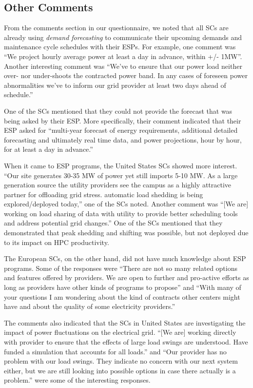 \subsection{Other Comments}
\label{comm}
From the comments section in our questionnaire, we noted that all SCs are already using \emph{demand forecasting} to communicate their upcoming demands and maintenance cycle schedules with their ESPs. For example, one comment was ``We project hourly average power at least a day in advance, within +/- 1MW''. Another interesting comment was ``We've to ensure that our power load neither over- nor under-shoots the contracted power band. In any cases of foreseen power abnormalities we've to inform our grid provider at least two days ahead of schedule.''

One of the SCs mentioned that they could not provide the forecast that was being asked by their ESP. More specifically, their comment indicated that their ESP asked for ``multi-year forecast of energy requirements, additional detailed forecasting and ultimately real time data, and power projections, hour by hour, for at least a day in advance.''

When it came to ESP programs, the United States SCs showed more interest. ``Our site generates 30-35 MW of power yet still imports 5-10 MW. As a large generation source the utility providers see the campus as a highly attractive partner for offloading grid stress. automatic load shedding is being explored/deployed today,'' one of the SCs noted. Another comment was ``[We are] working on load sharing of data with utility to provide better scheduling tools and address potential grid changes.'' One of the SCs mentioned that they demonstrated that peak shedding and shifting was possible, but not deployed due to its impact on HPC productivity. 

The European SCs, on the other hand, did not have much knowledge about ESP programs. Some of the responses were ``There are not so many related options and features offered by providers. We are open to further and pro-active efforts as long as providers have other kinds of programs to propose'' and ``With many of your questions I am wondering about the kind of contracts other centers might have and about the quality of some electricity providers.''

The comments also indicated that the SCs in United States are investigating the impact of power fluctuations on the electrical grid. ``[We are] working directly with provider to ensure that the effects of large load swings are understood. Have funded a simulation that accounts for all loads.'' and ``Our provider has no problem with our load swings. They indicate no concern with our next system either, but we are still looking into possible options in case there actually is a problem.'' were some of the interesting responses.
